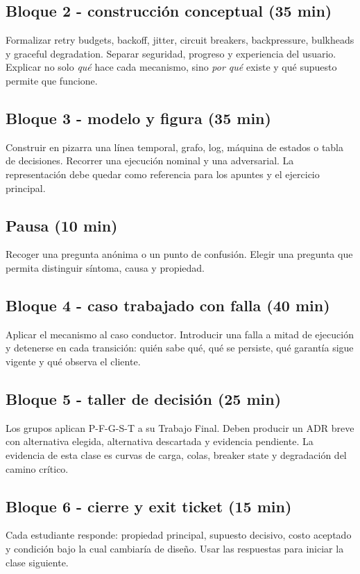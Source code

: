 \documentclass[variant=docente,cover=institutional,mode=screen]{ua-engineering-v6-article}
\begin{document}
\subsection*{Bloque 2 - construcción conceptual (35 min)}
Formalizar retry budgets, backoff, jitter, circuit breakers, backpressure, bulkheads y graceful degradation. Separar seguridad, progreso y experiencia del usuario. Explicar no solo \emph{qué} hace cada mecanismo, sino \emph{por qué} existe y qué supuesto permite que funcione.

\subsection*{Bloque 3 - modelo y figura (35 min)}
Construir en pizarra una línea temporal, grafo, log, máquina de estados o tabla de decisiones. Recorrer una ejecución nominal y una adversarial. La representación debe quedar como referencia para los apuntes y el ejercicio principal.

\subsection*{Pausa (10 min)}
Recoger una pregunta anónima o un punto de confusión. Elegir una pregunta que permita distinguir síntoma, causa y propiedad.

\subsection*{Bloque 4 - caso trabajado con falla (40 min)}
Aplicar el mecanismo al caso conductor. Introducir una falla a mitad de ejecución y detenerse en cada transición: quién sabe qué, qué se persiste, qué garantía sigue vigente y qué observa el cliente.

\subsection*{Bloque 5 - taller de decisión (25 min)}
Los grupos aplican P-F-G-S-T a su Trabajo Final. Deben producir un ADR breve con alternativa elegida, alternativa descartada y evidencia pendiente. La evidencia de esta clase es curvas de carga, colas, breaker state y degradación del camino crítico.

\subsection*{Bloque 6 - cierre y exit ticket (15 min)}
Cada estudiante responde: propiedad principal, supuesto decisivo, costo aceptado y condición bajo la cual cambiaría de diseño. Usar las respuestas para iniciar la clase siguiente.
\end{document}
